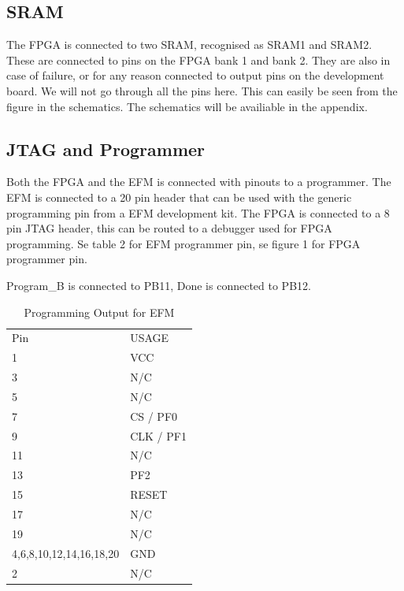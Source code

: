 \subsection{SRAM}
The FPGA is connected to two SRAM, recognised as SRAM1 and SRAM2. These are connected to pins on the FPGA bank 1 and bank 2.  They are also in case of failure, or for any reason connected to output pins on the development board. We will not go through all the pins here. This can easily be seen from the figure in the schematics. The schematics will be availiable in the appendix. 

\subsection{JTAG and Programmer}
Both the FPGA and the EFM is connected with pinouts to a programmer. The EFM is connected to a 20 pin header that can be used with the generic programming pin from a EFM development kit. 
The FPGA is connected to a 8 pin JTAG header, this can be routed to a debugger used for FPGA programming.  Se table 2 for EFM programmer pin, se figure 1 for FPGA programmer pin.

Program\_B is connected to PB11, Done is connected to PB12.
\begin{table}[]
    \centering
    \caption{Programming Output for EFM}
    \label{efmprogrammer}
    \begin{tabular}{ll}
        Pin                     & USAGE     \\
        1                       & VCC       \\
        3                       & N/C       \\
        5                       & N/C       \\
        7                       & CS / PF0  \\
        9                       & CLK / PF1 \\
        11                      & N/C       \\
        13                      & PF2       \\
        15                      & RESET     \\
        17                      & N/C       \\
        19                      & N/C       \\
        4,6,8,10,12,14,16,18,20 & GND       \\
        2                       & N/C
    \end{tabular}
\end{table}

